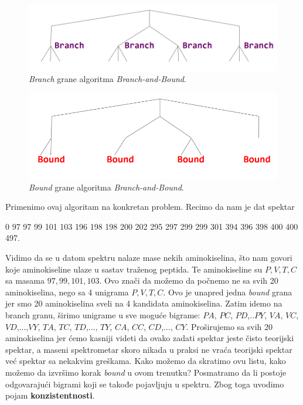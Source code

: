 \begin{minipage}{\textwidth}
	\centering
	\begin{minipage}{0.45\textwidth}
		\begin{figure}[H]
			\centering
			\includegraphics[width=\textwidth]{poglavlja/4/slike/branch.png}
			\caption{\textit{Branch} grane algoritma \textit{Branch-and-Bound}.}
			\label{slika:branch}
		\end{figure} 
	\end{minipage}
	\hfill 
	\begin{minipage}{0.45\textwidth}
		\begin{figure}[H]
			\centering
			\includegraphics[width=\textwidth]{poglavlja/4/slike/bound.png}
			\caption{\textit{Bound} grane algoritma \textit{Branch-and-Bound}.}
			\label{slika:bound}
		\end{figure} 
	\end{minipage}
	\vspace*{1em}
\end{minipage}

Primenimo ovaj algoritam na konkretan problem. Recimo da nam je dat spektar
\begin{center}
 0 97 97 99 101 103 196 198 198 200 202 295 297 299 299 301 394 396 398 400 400 497.
 \end{center} 
\noindent  Vidimo da se u datom spektru nalaze mase nekih aminokiselina, što nam govori koje aminokiseline ulaze u sastav traženog peptida. Te aminokiseline su $P,V,T,C$ sa masama $97,99, 101, 103$. Ovo znači da možemo da počnemo ne sa svih 20 aminokiselina, nego sa 4 unigrama $P,V,T,C$. Ovo je unapred jedna \textit{bound} grana jer smo 20 aminokiselina sveli na 4 kandidata aminokiselina. Zatim idemo na branch granu, širimo unigrame u sve moguće bigrame: $PA$, $PC$, $PD$,..$PY$, $VA$, $VC$, $VD$,...,$VY$, $TA$, $TC$, $TD$,..., $TY$, $CA$, $CC$, $CD$,..., $CY$. Proširujemo sa svih 20 aminokiselina jer ćemo kasniji videti da ovako zadati spektar jeste čisto teorijski spektar, a maseni spektrometar skoro nikada u praksi ne vraća teorijski spektar već spektar sa nekakvim greškama. Kako možemo da skratimo ovu listu, kako možemo da izvršimo korak \textit{bound} u ovom trenutku? Posmatramo da li postoje odgovarajući bigrami koji se takođe pojavljuju u spektru. Zbog toga uvodimo pojam \textbf{konzistentnosti}.

